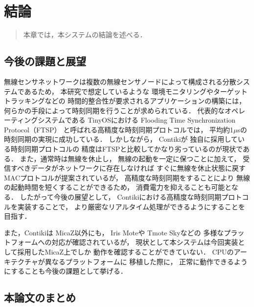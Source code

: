 \chapter{結論}
\begin{large}
\begin{quote}
本章では，本システムの結論を述べる．
\end{quote}
\end{large}
\clearpage

\section{今後の課題と展望}
無線センサネットワークは複数の無線センサノードによって構成される分散システムであるため，
本研究で想定しているような
環境モニタリングやターゲットトラッキングなどの
時間的整合性が要求されるアプリケーションの構築には，
何らかの手段によって時刻同期を行うことが求められている．
代表的なオペレーティングシステムである
TinyOS\cite{Hill:2000:SAD:356989.356998}\cite{Levis04tinyos:an}における
Flooding Time Synchronization Protocol（FTSP）\cite{Maroti:2004:FTS:1031495.1031501}
と呼ばれる高精度な時刻同期プロトコルでは，
平均約1$\mu$sの時刻同期の実現に成功している．
しかしながら，
Contiki\cite{Dunkels:2004:CLF:1032658.1034117}が
独自に採用している時刻同期プロトコルの
精度はFTSPと比較してかなり劣っているのが現状である．
また，通常時は無線を休止し，
無線の起動を一定に保つことに加えて，
受信すべきデータがネットワークに存在しなければ
すぐに無線を休止状態に戻す
MACプロトコルが提案されているが，
高精度な時刻同期をすることにより
無線の起動時間を短くすることができるため，
消費電力を抑えることも可能となる．
したがって今後の展望として，
Contikiにおける高精度な時刻同期プロトコルを実装することで，
より厳密なリアルタイム処理ができるようにすることを目指す．

また，Contikiは
MicaZ\cite{Hill:2002:MWP:623308.624560}以外にも，
Iris Mote\cite{irismote}や
Tmote Sky\cite{tmote_sky}などの
多様なプラットフォームへの対応が確認されているが，
現状として本システムは今回実装として採用したMicaZ上でしか
動作を確認することができていない．
CPUのアーキテクチャが異なるプラットフォームに
移植した際に，
正常に動作できるようにすることも今後の課題として挙げる．



\section{本論文のまとめ}

